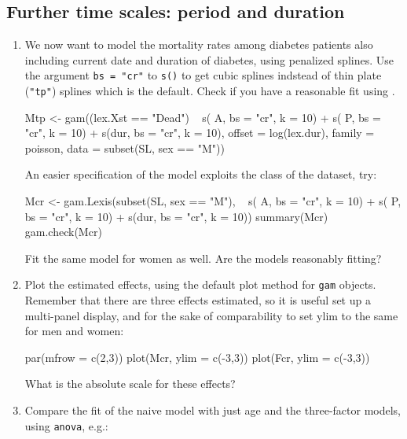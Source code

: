 \subsection*{Further time scales: period and duration}
\begin{enumerate}[resume]
\item We now want to model the mortality rates among diabetes patients
  also including current date and duration of diabetes, using penalized
  splines.  Use the argument \texttt{bs = "cr"} to \texttt{s()} to get
  cubic splines indstead of thin plate (\texttt{"tp"}) splines which is
  the default. Check if you have a reasonable fit using .
\begin{Schunk}
\begin{Sinput}
 Mtp <- gam((lex.Xst == "Dead") ~ s(  A, bs = "cr", k = 10) +
                                  s(  P, bs = "cr", k = 10) +
                                  s(dur, bs = "cr", k = 10),
             offset = log(lex.dur),
             family = poisson,
               data = subset(SL, sex == "M"))
\end{Sinput}
\end{Schunk}
An easier specification of the model exploits the  class
of the dataset, try:
\begin{Schunk}
\begin{Sinput}
 Mcr <- gam.Lexis(subset(SL, sex == "M"),
                  ~ s(  A, bs = "cr", k = 10) +
                    s(  P, bs = "cr", k = 10) +
                    s(dur, bs = "cr", k = 10))
 summary(Mcr)
 gam.check(Mcr)
\end{Sinput}
\end{Schunk}
Fit the same model for women as well. Are the models reasonably fitting?
\item Plot the estimated effects, using the default plot method for
  \texttt{gam} objects. Remember that there are three effects
  estimated, so it is useful set up a multi-panel display, and for
  the sake of comparability to set ylim to the same for men and women:
\begin{Schunk}
\begin{Sinput}
 par(mfrow = c(2,3))
 plot(Mcr, ylim = c(-3,3))
 plot(Fcr, ylim = c(-3,3))
\end{Sinput}
\end{Schunk}
What is the absolute scale for these effects?
\item Compare the fit of the naive model with just age and the
  three-factor models, using \texttt{anova}, e.g.:
\begin{Schunk}

\end{Schunk}
\end{enumerate}

